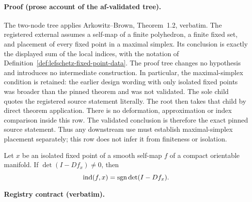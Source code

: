\paragraph{Proof (prose account of the af-validated tree).}
The two-node tree applies Arkowitz--Brown, Theorem~1.2, verbatim.
The registered external assumes a self-map of a finite polyhedron, a finite fixed
set, and placement of every fixed point in a maximal simplex.  Its conclusion is
exactly the displayed sum of the local indices, with the notation of
Definition~\ref{def:lefschetz-fixed-point-data}.
The proof tree changes no hypothesis and introduces no intermediate construction.
In particular, the maximal-simplex condition is retained: the earlier design
wording with only isolated fixed points was broader than the pinned theorem and
was not validated.
The sole child quotes the registered source statement literally.
The root then takes that child by direct theorem application.
There is no deformation, approximation or index comparison inside this row.
The validated conclusion is therefore the exact pinned source statement.
Thus any downstream use must establish maximal-simplex placement separately;
this row does not infer it from finiteness or isolation.

\begin{lemma}\label{lem:topology-local-index-sign}
Let $x$ be an isolated fixed point of a smooth self-map $f$ of a compact orientable
manifold.  If $\det(I-Df_x)\ne0$, then
\[
  \operatorname{ind}(f,x)=\operatorname{sgn}\det(I-Df_x).
\]
\end{lemma}

\noindent\textbf{Registry contract (verbatim).}

